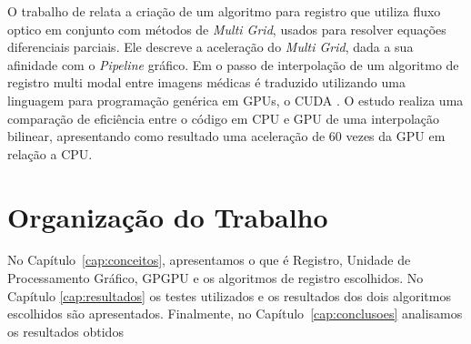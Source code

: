 	O trabalho de \cite{grossauer2008gpu} relata a criação de um algoritmo para registro que utiliza fluxo optico em 
conjunto com métodos de \textit{Multi Grid}, usados para resolver equações diferenciais parciais. Ele descreve
a aceleração do \textit{Multi Grid}, dada a sua afinidade com o \textit{Pipeline} gráfico. Em \cite{bui2009performance}
o passo de interpolação de um algoritmo de registro multi modal entre imagens médicas é traduzido utilizando uma 
linguagem para programação genérica em GPUs, o CUDA \cite{nvidia2007compute}. O estudo realiza uma comparação de eficiência
entre o código em CPU e GPU de uma interpolação bilinear, apresentando como resultado uma aceleração de 60 vezes da GPU
em relação a CPU.
	


\section{Organização do Trabalho}
\label{sec:organizacao_trabalho}

No Capítulo~\ref{cap:conceitos}, apresentamos o que é Registro, Unidade de Processamento Gráfico, GPGPU e os algoritmos 
de registro escolhidos. No Capítulo \ref{cap:resultados} os testes utilizados e os resultados dos dois algoritmos 
escolhidos são apresentados. Finalmente, no Capítulo~\ref{cap:conclusoes} analisamos os resultados obtidos 